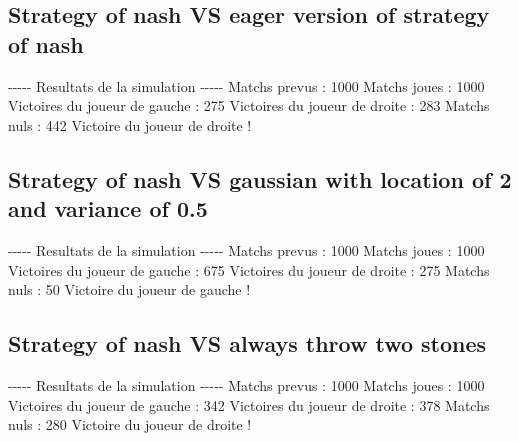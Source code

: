 \documentclass{article}%
\begin{document}
%
\subsection{Strategy of nash VS eager version of strategy of nash}%
\label{subsec:Strategy of nash VS eager version of strategy of nash}%
{-}{-}{-}{-}{-} Resultats de la simulation {-}{-}{-}{-}{-}\newline%
		\newline%
Matchs prevus : 1000\newline%
Matchs joues : 1000\newline%
\newline%
Victoires du joueur de gauche : 275\newline%
Victoires du joueur de droite : 283\newline%
Matchs nuls : 442\newline%
\newline%
Victoire du joueur de droite !

%
\subsection{Strategy of nash VS gaussian with location of 2 and variance of 0.5}%
\label{subsec:Strategy of nash VS gaussian with location of 2 and variance of 0.5}%
{-}{-}{-}{-}{-} Resultats de la simulation {-}{-}{-}{-}{-}\newline%
		\newline%
Matchs prevus : 1000\newline%
Matchs joues : 1000\newline%
\newline%
Victoires du joueur de gauche : 675\newline%
Victoires du joueur de droite : 275\newline%
Matchs nuls : 50\newline%
\newline%
Victoire du joueur de gauche !

%
\subsection{Strategy of nash VS always throw two stones}%
\label{subsec:Strategy of nash VS always throw two stones}%
{-}{-}{-}{-}{-} Resultats de la simulation {-}{-}{-}{-}{-}\newline%
		\newline%
Matchs prevus : 1000\newline%
Matchs joues : 1000\newline%
\newline%
Victoires du joueur de gauche : 342\newline%
Victoires du joueur de droite : 378\newline%
Matchs nuls : 280\newline%
\newline%
Victoire du joueur de droite !
\end{document}
